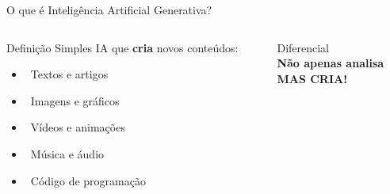 \documentclass[aspectratio=169,12pt]{beamer}
\begin{document}
\begin{frame}{O que é Inteligência Artificial Generativa?}
    \begin{columns}
        \begin{column}{0.6\textwidth}
            \begin{block}{Definição Simples}
                IA que \textbf{cria} novos conteúdos:
                \begin{itemize}
                    \item \faFile\, Textos e artigos
                    \item \faImage\, Imagens e gráficos
                    \item \faVideo\, Vídeos e animações
                    \item \faMusic\, Música e áudio
                    \item \faCode\, Código de programação
                \end{itemize}
            \end{block}
        \end{column}
        \begin{column}{0.4\textwidth}
            \begin{alertblock}{Diferencial}
                \centering
                \textcolor{warning}{\faLightbulb} \\
                \textbf{Não apenas analisa} \\
                \textbf{MAS CRIA!}
            \end{alertblock}
        \end{column}
    \end{columns}
\end{frame}
\end{document}

